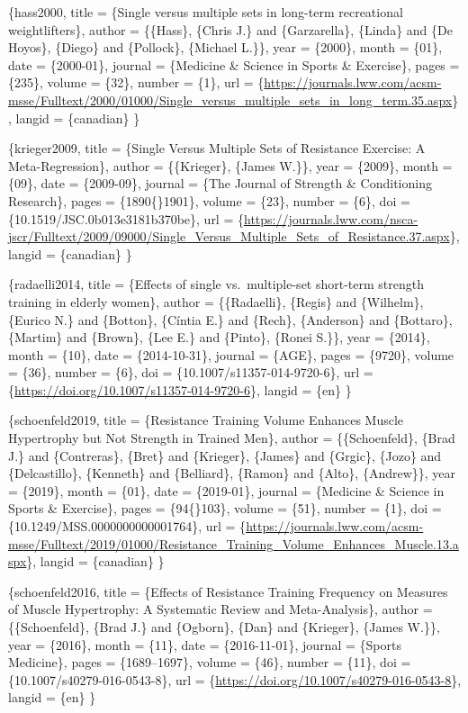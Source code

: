 \documentclass[
]{book}
\begin{document}
\citet{article}\{hass2000,
title = \{Single versus multiple sets in long-term recreational weightlifters\},
author = \{\{Hass\}, \{Chris J.\} and \{Garzarella\}, \{Linda\} and \{De Hoyos\}, \{Diego\} and \{Pollock\}, \{Michael L.\}\},
year = \{2000\},
month = \{01\},
date = \{2000-01\},
journal = \{Medicine \& Science in Sports \& Exercise\},
pages = \{235\},
volume = \{32\},
number = \{1\},
url = \{\url{https://journals.lww.com/acsm-msse/Fulltext/2000/01000/Single_versus_multiple_sets_in_long_term.35.aspx}\},
langid = \{canadian\}
\}

\citet{article}\{krieger2009,
title = \{Single Versus Multiple Sets of Resistance Exercise: A Meta-Regression\},
author = \{\{Krieger\}, \{James W.\}\},
year = \{2009\},
month = \{09\},
date = \{2009-09\},
journal = \{The Journal of Strength \& Conditioning Research\},
pages = \{1890\{\textendash\}1901\},
volume = \{23\},
number = \{6\},
doi = \{10.1519/JSC.0b013e3181b370be\},
url = \{\url{https://journals.lww.com/nsca-jscr/Fulltext/2009/09000/Single_Versus_Multiple_Sets_of_Resistance.37.aspx}\},
langid = \{canadian\}
\}

\citet{article}\{radaelli2014,
title = \{Effects of single vs.~multiple-set short-term strength training in elderly women\},
author = \{\{Radaelli\}, \{Regis\} and \{Wilhelm\}, \{Eurico N.\} and \{Botton\}, \{Cíntia E.\} and \{Rech\}, \{Anderson\} and \{Bottaro\}, \{Martim\} and \{Brown\}, \{Lee E.\} and \{Pinto\}, \{Ronei S.\}\},
year = \{2014\},
month = \{10\},
date = \{2014-10-31\},
journal = \{AGE\},
pages = \{9720\},
volume = \{36\},
number = \{6\},
doi = \{10.1007/s11357-014-9720-6\},
url = \{\url{https://doi.org/10.1007/s11357-014-9720-6}\},
langid = \{en\}
\}

\citet{article}\{schoenfeld2019,
title = \{Resistance Training Volume Enhances Muscle Hypertrophy but Not Strength in Trained Men\},
author = \{\{Schoenfeld\}, \{Brad J.\} and \{Contreras\}, \{Bret\} and \{Krieger\}, \{James\} and \{Grgic\}, \{Jozo\} and \{Delcastillo\}, \{Kenneth\} and \{Belliard\}, \{Ramon\} and \{Alto\}, \{Andrew\}\},
year = \{2019\},
month = \{01\},
date = \{2019-01\},
journal = \{Medicine \& Science in Sports \& Exercise\},
pages = \{94\{\textendash\}103\},
volume = \{51\},
number = \{1\},
doi = \{10.1249/MSS.0000000000001764\},
url = \{\url{https://journals.lww.com/acsm-msse/Fulltext/2019/01000/Resistance_Training_Volume_Enhances_Muscle.13.aspx}\},
langid = \{canadian\}
\}

\citet{article}\{schoenfeld2016,
title = \{Effects of Resistance Training Frequency on Measures of Muscle Hypertrophy: A Systematic Review and Meta-Analysis\},
author = \{\{Schoenfeld\}, \{Brad J.\} and \{Ogborn\}, \{Dan\} and \{Krieger\}, \{James W.\}\},
year = \{2016\},
month = \{11\},
date = \{2016-11-01\},
journal = \{Sports Medicine\},
pages = \{1689--1697\},
volume = \{46\},
number = \{11\},
doi = \{10.1007/s40279-016-0543-8\},
url = \{\url{https://doi.org/10.1007/s40279-016-0543-8}\},
langid = \{en\}
\}
\end{document}
